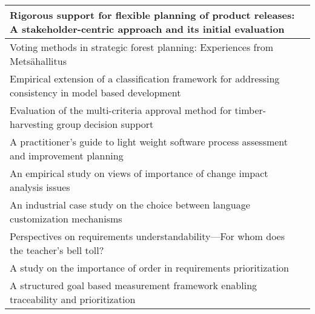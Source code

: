 \begin{center}
{\begin{tabular}{
|>{\raggedright}p{}
|>{\raggedright}p{}
|}
Rigorous support for flexible planning of product releases: A stakeholder-centric approach and its initial evaluation & \cite{Heikkila2010}\tabularnewline \hline
Voting methods in strategic forest planning: Experiences from Mets\"{a}hallitus & \cite{Hiltunen2008}\tabularnewline \hline
Empirical extension of a classification framework for addressing consistency in model based development & \cite{Kuzniarz2010}\tabularnewline \hline
Evaluation of the multi-criteria approval method for timber-harvesting group decision support & \cite{Laukkanen2005a} \tabularnewline \hline
A practitioner's guide to light weight software process assessment and improvement planning & \cite{Pettersson2008} \tabularnewline \hline
An empirical study on views of importance of change impact analysis issues & \cite{Rovegard2008} \tabularnewline \hline
An industrial case study on the choice between language customization mechanisms & \cite{Staron2006} \tabularnewline \hline
Perspectives on requirements understandability---For whom does the teacher's bell toll? & \cite{Svahnberg2008} \tabularnewline \hline
A study on the importance of order in requirements prioritization & \cite{Svahnberg2009} \tabularnewline \hline
A structured goal based measurement framework enabling traceability and prioritization & \cite{Touseef2010} \tabularnewline \hline

\end{tabular}
} %
\end{center}

